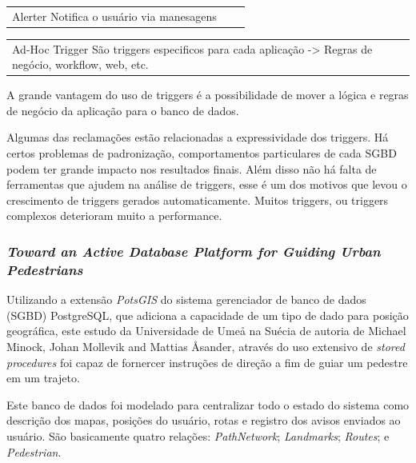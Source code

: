 \documentclass[conference]{IEEEtran}
\begin{document}
\begin{table}[H]
\begin{tabular}{p{8cm}p{8cm}p{8cm}}
        \end{tabular}
        \begin{tabular}{p{8cm}p{8cm}p{8cm}}
            \vspace{0pt}
           Alerter
            \vspace{0pt}
           Notifica o usuário via manesagens
        \end{tabular}
        \begin{tabular}{p{8cm}p{8cm}p{8cm}}
            \vspace{0pt}
            Ad-Hoc Trigger
            \vspace{0pt}
            São triggers especificos para cada aplicação -> Regras de negócio, workflow, web, etc.
        \end{tabular}
    \end{table}

    A grande vantagem do uso de triggers é a possibilidade de mover a lógica e regras de negócio da aplicação para o banco de dados.

    Algumas das reclamações estão relacionadas a expressividade dos triggers. Há certos problemas de padronização, comportamentos particulares de cada SGBD podem ter grande impacto nos resultados finais. Além disso não há falta de ferramentas que ajudem na análise de triggers, esse é um dos motivos que levou o crescimento de triggers gerados automaticamente. Muitos triggers, ou triggers complexos deterioram muito a performance.

    \subsubsection{\textit{Toward an Active Database Platform for Guiding Urban Pedestrians}}
    Utilizando a extensão \textit{PotsGIS} do sistema gerenciador de banco de dados (SGBD) PostgreSQL, que adiciona a capacidade de um tipo de dado para posição geográfica, este estudo da Universidade de Ume\r{a} na Suécia de autoria de Michael Minock, Johan Mollevik and Mattias \r{A}sander, através do uso extensivo de \textit{stored procedures} foi capaz de fornercer instruções de direção a fim de guiar um pedestre em um trajeto.

    Este banco de dados foi modelado para centralizar todo o estado do sistema como descrição dos mapas, posições do usuário, rotas e registro dos avisos enviados ao usuário. São basicamente quatro relações: \textit{PathNetwork}; \textit{Landmarks}; \textit{Routes}; e \textit{Pedestrian}.
\end{document}
